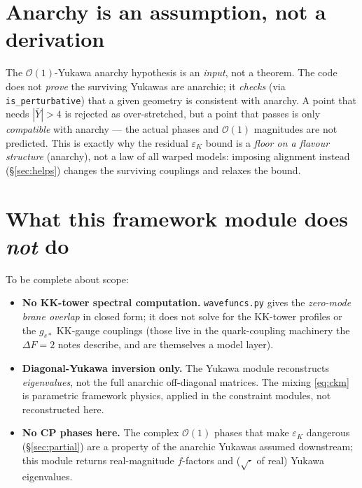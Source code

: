 \documentclass[11pt]{article}
\newcommand{\epsK}{\varepsilon_K}
\newcommand{\gss}{g_{s*}}
\newcommand{\code}[1]{\texttt{#1}}
\theoremstyle{definition}
\begin{document}
\section{Anarchy is an assumption, not a derivation}
\label{sec:anarchyassumption}

The $\mathcal{O}(1)$-Yukawa anarchy hypothesis is an \emph{input}, not a theorem.
The code does not \emph{prove} the surviving Yukawas are anarchic; it
\emph{checks} (via \code{is\_perturbative}) that a given geometry is consistent
with anarchy. A point that needs $|\bar Y|>4$ is rejected as over-stretched, but a
point that passes is only \emph{compatible} with anarchy --- the actual phases and
$\mathcal{O}(1)$ magnitudes are not predicted. This is exactly why the residual
$\epsK$ bound is a \emph{floor on a flavour structure} (anarchy), not a law of all
warped models: imposing alignment instead (\S\ref{sec:helps}) changes the
surviving couplings and relaxes the bound.

\section{What this framework module does \emph{not} do}
\label{sec:scope}

To be complete about scope:
\begin{itemize}[leftmargin=1.4em]
\item \textbf{No KK-tower spectral computation.} \code{wavefuncs.py} gives the
\emph{zero-mode brane overlap} in closed form; it does not solve for the KK-tower
profiles or the $\gss$ KK-gauge couplings (those live in the quark-coupling
machinery the $\Delta F=2$ notes describe, and are themselves a model layer).
\item \textbf{Diagonal-Yukawa inversion only.} The Yukawa module reconstructs
\emph{eigenvalues}, not the full anarchic off-diagonal matrices. The mixing
\eqref{eq:ckm} is parametric framework physics, applied in
the constraint modules, not reconstructed here.
\item \textbf{No CP phases here.} The complex $\mathcal{O}(1)$ phases that make
$\epsK$ dangerous (\S\ref{sec:partial}) are a property of the anarchic Yukawas
assumed downstream; this module returns real-magnitude $f$-factors and
($\sqrt{\cdot}$ of real) Yukawa eigenvalues.
\end{itemize}
\end{document}

